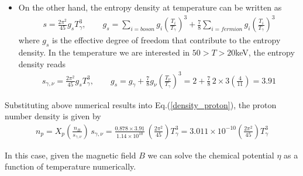 \documentclass[Universe,article,submit,moreauthors,pdftex]{Definitions/mdpi}
\begin{document}
\begin{itemize}
  \item On the other hand, the entropy density at temperature can be written as \cite{Kolb:1990vq}
\begin{align}
s=\frac{2\pi^2}{45}g_sT_\gamma^3,\qquad g_s=\sum_{i=boson}g_i\left(\frac{T_i}{T_\gamma}\right)^3+\frac{7}{8}\sum_{i=fermion}g_i\left(\frac{T_i}{T_\gamma}\right)^3
\end{align}
where $g_s$ is the effective degree of freedom that contribute to the entropy density.  In the temperature we are interested in $50>T>20$keV, the entropy density reads
\begin{align}
s_{\gamma,\nu}=\frac{2\pi^2}{45}g_sT_\gamma^3,\qquad g_s=g_\gamma+\frac{7}{8}g_\nu\left(\frac{T_\nu}{T_\gamma}\right)^3=2+\frac{7}{8}\,2\times3\left(\frac{4}{11}\right)=3.91
\end{align}
\end{itemize}

Substituting above numerical results into Eq.(\ref{density_proton}), the proton number density is given by
\begin{align}
n_p= X_p\left(\frac{n_B}{s_{\gamma,\nu}}\right)\,s_{\gamma,\nu}=\frac{0.878\times3.91}{1.14\times10^{10}}\,\left(\frac{2\pi^2}{45}\right)T_\gamma^3=3.011\times10^{-10}\left(\frac{2\pi^2}{45}\right)T_\gamma^3
\end{align}

In this case, given the magnetic field $B$ we can solve the chemical potential $\eta$ as a function of temperature numerically.

\end{document}
